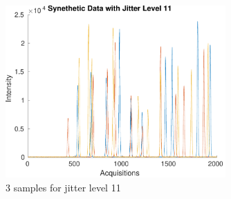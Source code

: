 \documentclass[preprint,12pt]{elsarticle}
\begin{document}
\begin{figure}[h]
    \centering
    \includegraphics[width=0.75\textwidth]{figures/jitter_illustration11.pdf}
    \caption{3 samples for jitter level 11}
    \label{fig:figure11}
\end{figure}






\end{document}
